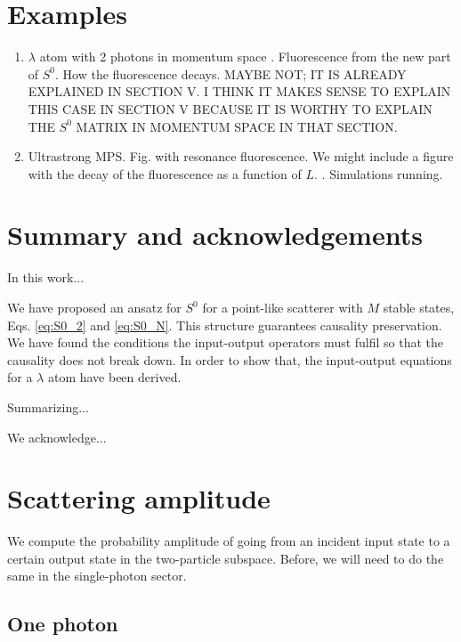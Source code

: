 \documentclass[aps,pra,reprint,amsmath,amssymb]{revtex4-1}
\begin{document}
\section{Examples}

{\color{blue}
\begin{enumerate}
\item $\lambda$ atom with 2 photons in momentum space \cite{Xu2016}. Fluorescence from the new part of $S^0$. How the fluorescence decays. MAYBE NOT; IT IS ALREADY EXPLAINED IN SECTION V. I THINK IT MAKES SENSE TO EXPLAIN THIS CASE IN SECTION V BECAUSE IT IS WORTHY TO EXPLAIN THE $S^0$ MATRIX IN MOMENTUM SPACE IN THAT SECTION.
\item Ultrastrong MPS. Fig. with resonance fluorescence. We might include a figure with the decay of the fluorescence as a function of $L$. \cite{Sanchez-Burillo2014,Sanchez-Burillo2015}. Simulations running.
\end{enumerate}
}

\section{Summary and acknowledgements}

In this work...

We have proposed an ansatz for $S^0$ for a point-like scatterer with $M$ stable states, Eqs. \eqref{eq:S0_2} and \eqref{eq:S0_N}. This structure guarantees causality preservation. We have found the conditions the input-output operators must fulfil so that the causality does not break down. In order to show that, the input-output equations for a $\lambda$ atom have been derived.

Summarizing...

We acknowledge...

\appendix

\section{Scattering amplitude}\label{app:A}

We compute the probability amplitude of going from an incident input state to a certain output state in the two-particle subspace. Before, we will need to do the same in the single-photon sector. 

\subsection{One photon}
\end{document}
